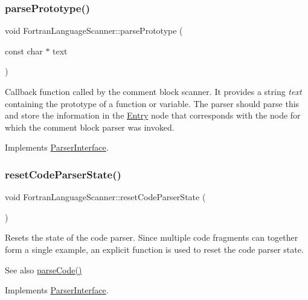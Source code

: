 \subsubsection{\texorpdfstring{parsePrototype()}{parsePrototype()}}
{\footnotesize\ttfamily void Fortran\+Language\+Scanner\+::parse\+Prototype (\begin{DoxyParamCaption}\item[{const char $\ast$}]{text }\end{DoxyParamCaption})\hspace{0.3cm}{\ttfamily [virtual]}}

Callback function called by the comment block scanner. It provides a string {\itshape text} containing the prototype of a function or variable. The parser should parse this and store the information in the \mbox{\hyperlink{class_entry}{Entry}} node that corresponds with the node for which the comment block parser was invoked. 

Implements \mbox{\hyperlink{class_parser_interface_a5ebf0f524a296845befa22c85a4cc80b}{Parser\+Interface}}.

\mbox{\label{class_fortran_language_scanner_a431c7d79af2cd6b93081f3db7cdaf1c0}} 
\subsubsection{\texorpdfstring{resetCodeParserState()}{resetCodeParserState()}}
{\footnotesize\ttfamily void Fortran\+Language\+Scanner\+::reset\+Code\+Parser\+State (\begin{DoxyParamCaption}{ }\end{DoxyParamCaption})\hspace{0.3cm}{\ttfamily [virtual]}}

Resets the state of the code parser. Since multiple code fragments can together form a single example, an explicit function is used to reset the code parser state. \begin{DoxySeeAlso}{See also}
\mbox{\hyperlink{class_fortran_language_scanner_a76c29cd4656300093fba9179184a4a7c}{parse\+Code()}} 
\end{DoxySeeAlso}


Implements \mbox{\hyperlink{class_parser_interface_aee4fccd1865a4e8a6b9f2896811104ca}{Parser\+Interface}}.

